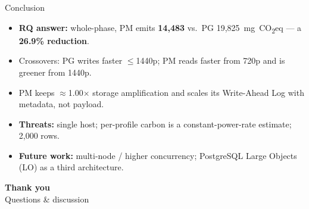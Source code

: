 \documentclass[aspectratio=169, table]{beamer}
\newcommand{\takeaway}[1]{\vspace{3pt}{\footnotesize #1}}
\newcommand{\best}[1]{\textbf{\color{praditagreen}#1}}
\begin{document}
\begin{frame}{Conclusion}
  \vspace{2pt}\footnotesize
  \begin{itemize}\setlength{\itemsep}{3pt}
    \item \textbf{RQ answer:} whole-phase, PM emits \best{14{,}483} vs.\ PG 19{,}825~mg~CO\textsubscript{2}eq --- a \textbf{26.9\% reduction}.
    \item Crossovers: PG writes faster $\le$1440p; PM reads faster from 720p and is greener from 1440p.
    \item PM keeps $\approx$1.00$\times$ storage amplification and scales its Write-Ahead Log with metadata, not payload.
    \item \textbf{Threats:} single host; per-profile carbon is a constant-power-rate estimate; 2{,}000 rows.
    \item \textbf{Future work:} multi-node / higher concurrency; PostgreSQL Large Objects (LO) as a third architecture.
  \end{itemize}
  \takeaway{Inline for small ingest; externalised object storage for large, read-heavy, carbon-sensitive tiers.}
\end{frame}

\begin{frame}{\hfill}
  \centering
  \Huge{\textbf{Thank you}}\\[8pt]
  \normalsize Questions \& discussion
\end{frame}
\end{document}
